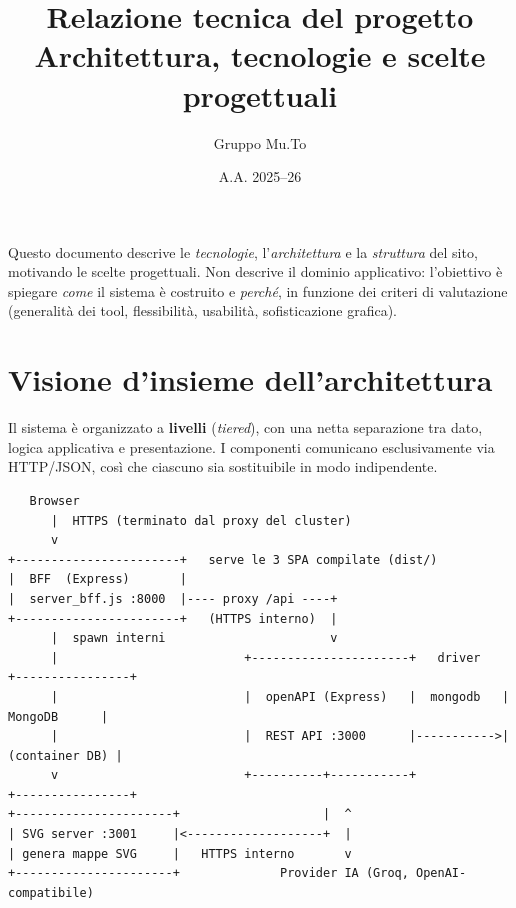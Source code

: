 \documentclass[11pt,a4paper]{article}
\title{\textbf{Relazione tecnica del progetto}\\[2pt]
\large Architettura, tecnologie e scelte progettuali}
\author{Gruppo Mu.To}
\date{A.A. 2025--26}
\begin{document}
\maketitle

\noindent
Questo documento descrive le \emph{tecnologie}, l'\emph{architettura} e la
\emph{struttura} del sito, motivando le scelte progettuali. Non descrive il
dominio applicativo: l'obiettivo è spiegare \emph{come} il sistema è costruito e
\emph{perché}, in funzione dei criteri di valutazione (generalità dei tool,
flessibilità, usabilità, sofisticazione grafica).

\tableofcontents
\bigskip

\section{Visione d'insieme dell'architettura}

Il sistema è organizzato a \textbf{livelli} (\emph{tiered}), con una netta
separazione tra dato, logica applicativa e presentazione. I componenti
comunicano esclusivamente via HTTP/JSON, così che ciascuno sia sostituibile in
modo indipendente.

\begin{verbatim}
   Browser
      |  HTTPS (terminato dal proxy del cluster)
      v
+-----------------------+   serve le 3 SPA compilate (dist/)
|  BFF  (Express)       |
|  server_bff.js :8000  |---- proxy /api ----+
+-----------------------+   (HTTPS interno)  |
      |  spawn interni                       v
      |                          +----------------------+   driver   +----------------+
      |                          |  openAPI (Express)   |  mongodb   |   MongoDB      |
      |                          |  REST API :3000      |----------->| (container DB) |
      v                          +----------+-----------+            +----------------+
+----------------------+                    |  ^
| SVG server :3001     |<-------------------+  |
| genera mappe SVG     |   HTTPS interno       v
+----------------------+              Provider IA (Groq, OpenAI-compatibile)
\end{verbatim}
\end{document}
